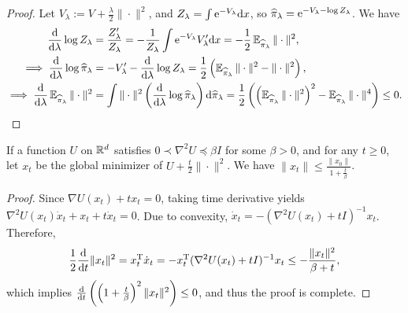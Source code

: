 \begin{proof}
    Let $V_\lambda:=V+\frac{\lambda}{2}\|\cdot\|^2$, and $Z_\lambda=\int\mathrm{e}^{-V_\lambda}\mathrm{d} x$, so $\widehat{\pi}_\lambda=\mathrm{e}^{-V_\lambda-\log Z_\lambda}$. We have
    \begin{align*}
        \frac{\mathrm{d}}{\mathrm{d}\lambda}\log Z_\lambda&=\frac{Z'_\lambda}{Z_\lambda}=-\frac{1}{Z_\lambda}\int\mathrm{e}^{-V_\lambda}V_\lambda'\mathrm{d} x=-\frac{1}{2}\operatorname{\mathbb{E}}_{\widehat{\pi}_\lambda}\|\cdot\|^2,\\
        \implies\frac{\mathrm{d}}{\mathrm{d}\lambda}\log\widehat{\pi}_\lambda&=-V'_\lambda-\frac{\mathrm{d}}{\mathrm{d}\lambda}\log Z_\lambda=\frac{1}{2}\left(\operatorname{\mathbb{E}}_{\widehat{\pi}_\lambda}\|\cdot\|^2-\|\cdot\|^2\right),\\
        \implies\frac{\mathrm{d}}{\mathrm{d}\lambda}\operatorname{\mathbb{E}}_{\widehat{\pi}_\lambda}{\|\cdot\|^2}&=\int\|\cdot\|^2\left(\frac{\mathrm{d}}{\mathrm{d}\lambda}\log\widehat{\pi}_\lambda\right)\mathrm{d}\widehat{\pi}_\lambda=\frac{1}{2}\left(\left(\operatorname{\mathbb{E}}_{\widehat{\pi}_\lambda}{\|\cdot\|^2}\right)^2-\operatorname{\mathbb{E}}_{\widehat{\pi}_\lambda}{\|\cdot\|^4}\right)\le0.  
    \end{align*}
\end{proof}

\begin{lemma}
    If a function $U$ on $\mathbb{R}^d$ satisfies $0\prec\nabla^2U\preceq\beta I$ for some $\beta>0$, and for any $t\ge0$, let $x_t$ be the global minimizer of $U+\frac{t}{2}\|\cdot\|^2$. We have $\|x_t\|\le\frac{\|x_0\|}{1+\frac{t}{\beta}}$.
    \label{lem:glob_min}
\end{lemma}
\begin{proof}
    Since $\nabla U(x_t)+tx_t=0$, taking time derivative yields $\nabla^2U(x_t)\dot x_t+x_t+t\dot x_t=0$. Due to convexity, $\dot x_t=-(\nabla^2U(x_t)+tI)^{-1}x_t$. Therefore,
    $$\frac{1}{2}\frac{\mathrm{d}}{\mathrm{d}t}\|x_t\|^2=x_t^\mathrm{T}\dot x_t=-x_t^\mathrm{T}(\nabla^2U(x_t)+tI)^{-1}x_t\le-\frac{\|x_t\|^2}{\beta+t},$$
    which implies $\frac{\mathrm{d}}{\mathrm{d}t}\left(\left(1+\frac{t}{\beta}\right)^2\|x_t\|^2\right)\le0$, and thus the proof is complete.
\end{proof}